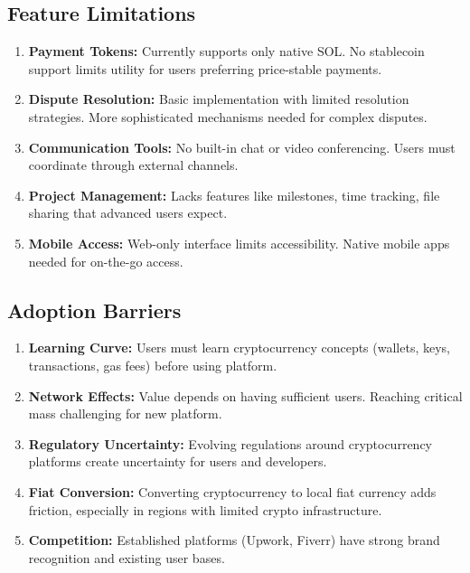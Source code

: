 \documentclass[a4paper,13pt,twoside]{report}
\theoremstyle{definition}
\begin{document}
\subsection{Feature Limitations}

\begin{enumerate}
    \item \textbf{Payment Tokens:} Currently supports only native SOL. No stablecoin support limits utility for users preferring price-stable payments.

    \item \textbf{Dispute Resolution:} Basic implementation with limited resolution strategies. More sophisticated mechanisms needed for complex disputes.

    \item \textbf{Communication Tools:} No built-in chat or video conferencing. Users must coordinate through external channels.

    \item \textbf{Project Management:} Lacks features like milestones, time tracking, file sharing that advanced users expect.

    \item \textbf{Mobile Access:} Web-only interface limits accessibility. Native mobile apps needed for on-the-go access.
\end{enumerate}

\subsection{Adoption Barriers}

\begin{enumerate}
    \item \textbf{Learning Curve:} Users must learn cryptocurrency concepts (wallets, keys, transactions, gas fees) before using platform.

    \item \textbf{Network Effects:} Value depends on having sufficient users. Reaching critical mass challenging for new platform.

    \item \textbf{Regulatory Uncertainty:} Evolving regulations around cryptocurrency platforms create uncertainty for users and developers.

    \item \textbf{Fiat Conversion:} Converting cryptocurrency to local fiat currency adds friction, especially in regions with limited crypto infrastructure.

    \item \textbf{Competition:} Established platforms (Upwork, Fiverr) have strong brand recognition and existing user bases.
\end{enumerate}
\end{document}
